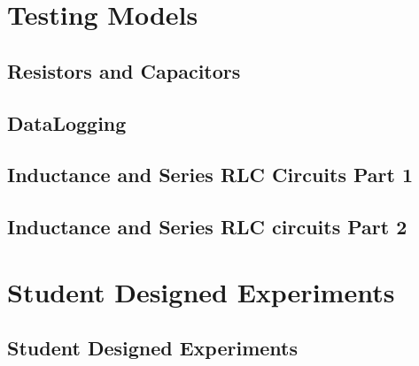 \documentclass{book}
\begin{document}
\part{Testing Models}

	\chapter{Resistors and Capacitors}
		
	
	
	\chapter{DataLogging}
		
		
	\chapter{Inductance and Series RLC Circuits Part 1}
		
	
	\chapter{Inductance and Series RLC circuits Part 2}
		


\part{Student Designed Experiments}

	\chapter{Student Designed Experiments\label{Student Designed Experiments}}
		
			
			
\end{document}
